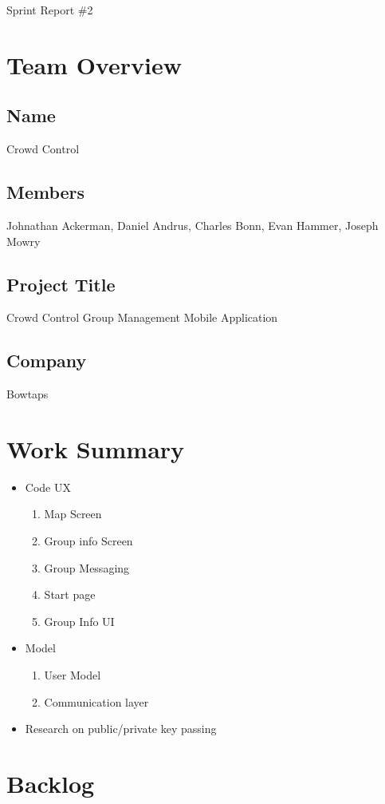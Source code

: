 \documentclass[11pt]{article}
\begin{document}
{\fontsize{16}{16}\selectfont Sprint  Report \#2}

\section*{Team Overview}

\subsection*{Name}
Crowd Control
\subsection*{Members}
Johnathan Ackerman, Daniel Andrus, Charles Bonn, Evan Hammer, Joseph Mowry
\subsection*{Project Title}
Crowd Control Group Management Mobile Application
\subsection*{Company}
Bowtaps

\section*{Work Summary}
	\begin{itemize}
	\item Code UX
		\begin{enumerate}
		\item Map Screen
		\item Group info Screen
		\item Group Messaging
		\item Start page
		\item Group Info UI
		\end{enumerate}
	\item Model
		\begin{enumerate}
		\item User Model
		\item Communication layer
		\end{enumerate}
	\item Research on public/private key passing
	\end{itemize}

\section*{Backlog}
\end{document}
